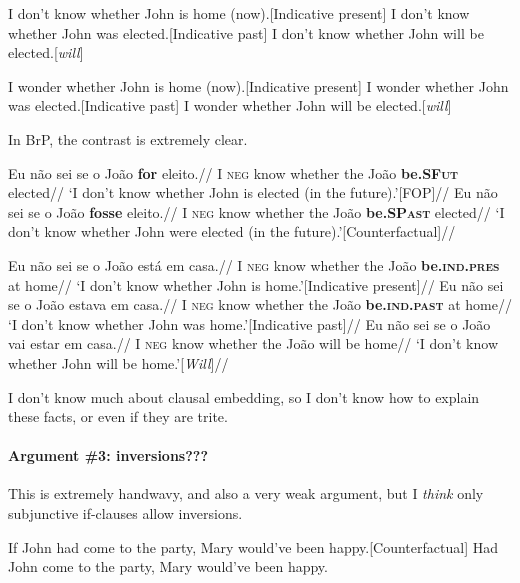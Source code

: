 \documentclass{linghandout}
\newcommand{\sfut}{\textsc{SFut}\xspace}
\begin{document}
\pex 
\a I don't know whether John is home (now).\hfill [Indicative present]
\a I don't know whether John was elected.\hfill [Indicative past]
\a I don't know whether John will be elected.\hfill [\textit{will}]
\xe

\pex 
\a I wonder whether John is home (now).\hfill [Indicative present]
\a I wonder whether John was elected.\hfill [Indicative past]
\a I wonder whether John will be elected.\hfill [\textit{will}]
\xe

In BrP, the contrast is extremely clear.

\pex 
\a\ljudge{*}\begingl 
\gla Eu não sei se o João \textbf{for} eleito.//
\glb I \textsc{neg} know whether the João \textbf{be.\sfut} elected//
\glft `I don't know whether John is elected (in the future).'\hfill [FOP]//
\endgl
\a\ljudge{*}\begingl 
\gla Eu não sei se o João \textbf{fosse} eleito.//
\glb I \textsc{neg} know whether the João \textbf{be.\textsc{SPast}} elected//
\glft `I don't know whether John were elected (in the future).'\hfill [Counterfactual]//
\endgl
\xe

\pex 
\a\begingl 
\gla Eu não sei se o João está em casa.//
\glb I \textsc{neg} know whether the João \textbf{be.\textsc{ind.pres}} at home//
\glft `I don't know whether John is home.'\hfill [Indicative present]//
\endgl
\a\begingl 
\gla Eu não sei se o João estava em casa.//
\glb I \textsc{neg} know whether the João \textbf{be.\textsc{ind.past}} at home//
\glft `I don't know whether John was home.'\hfill [Indicative past]//
\endgl
\a\begingl 
\gla Eu não sei se o João vai estar em casa.//
\glb I \textsc{neg} know whether the João will be home//
\glft `I don't know whether John will be home.'\hfill [\textit{Will}]//
\endgl
\xe

\begin{fancybox}{}
I don't know much about clausal embedding, so I don't know how to explain these facts, or even if they are trite.
\end{fancybox}

\paragraph{Argument \#3: inversions???} This is extremely handwavy, and also a very weak argument, but I \textit{think} only subjunctive if-clauses allow inversions.

\pex
\a If John had come to the party, Mary would've been happy.\hfill [Counterfactual]
\a Had John come to the party, Mary would've been happy.
\xe 
\end{document}
